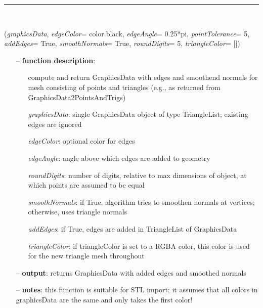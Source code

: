 \begin{itemize}[leftmargin=1.4cm]
\begin{itemize}[leftmargin=1.4cm]
\begin{itemize}[leftmargin=1.4cm]
\begin{itemize}[leftmargin=0.5cm]
\begin{itemize}[leftmargin=1.4cm]
\begin{itemize}[leftmargin=1.4cm]
\begin{itemize}[leftmargin=0.5cm]
\begin{itemize}[leftmargin=1.4cm]
%
\noindent\rule{8cm}{0.75pt}\vspace{1pt} \\ 
\begin{flushleft}
\label{sec:graphics:AddEdgesAndSmoothenNormals}
({\it graphicsData}, {\it edgeColor}= color.black, {\it edgeAngle}= 0.25*pi, {\it pointTolerance}= 5, {\it addEdges}= True, {\it smoothNormals}= True, {\it roundDigits}= 5, {\it triangleColor}= [])
\end{flushleft}
\setlength{\itemindent}{0.7cm}
\begin{itemize}[leftmargin=0.7cm]
\item[--]
{\bf function description}: \vspace{-6pt}
\begin{itemize}[leftmargin=1.2cm]
\setlength{\itemindent}{-0.7cm}
\item[]compute and return GraphicsData with edges and smoothend normals for mesh consisting of points and triangles (e.g., as returned from GraphicsData2PointsAndTrigs)
\item[]{\it graphicsData}: single GraphicsData object of type TriangleList; existing edges are ignored
\item[]{\it edgeColor}: optional color for edges
\item[]{\it edgeAngle}: angle above which edges are added to geometry
\item[]{\it roundDigits}: number of digits, relative to max dimensions of object, at which points are assumed to be equal
\item[]{\it smoothNormals}: if True, algorithm tries to smoothen normals at vertices; otherwise, uses triangle normals
\item[]{\it addEdges}: if True, edges are added in TriangleList of GraphicsData
\item[]{\it triangleColor}: if triangleColor is set to a RGBA color, this color is used for the new triangle mesh throughout
\end{itemize}
\item[--]
{\bf output}: returns GraphicsData with added edges and smoothed normals
\item[--]
{\bf notes}: this function is suitable for STL import; it assumes that all colors in graphicsData are the same and only takes the first color!
\vspace{12pt}\end{itemize}

\end{itemize}
\end{itemize}
\end{itemize}
\end{itemize}
\end{itemize}
\end{itemize}
\end{itemize}
\end{itemize}
